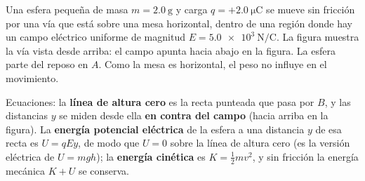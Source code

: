 \documentclass[12pt, a4paper]{article}
\begin{document}
\begin{exercise}[ID=montana-electrica, subtitle={Montaña rusa eléctrica}, tags={parcial3}, points=25, nuevapagina=true]
Una esfera pequeña de masa $m=\qty{2.0}{\gram}$ y carga $q=+\qty{2.0}{\micro\coulomb}$ se mueve sin fricción por una vía que está sobre una mesa horizontal, dentro de una región donde hay un campo eléctrico uniforme de magnitud $E=\qty{5.0e3}{\newton\per\coulomb}$. La figura muestra la vía vista desde arriba: el campo apunta hacia abajo en la figura. La esfera parte del reposo en $A$. Como la mesa es horizontal, el peso no influye en el movimiento.

Ecuaciones: la \textbf{línea de altura cero} es la recta punteada que pasa por $B$, y las distancias $y$ se miden desde ella \textbf{en contra del campo} (hacia arriba en la figura). La \textbf{energía potencial eléctrica} de la esfera a una distancia $y$ de esa recta es $U = qEy$, de modo que $U = 0$ sobre la línea de altura cero (es la versión eléctrica de $U = mgh$); la \textbf{energía cinética} es $K = \tfrac{1}{2} m v^2$, y sin fricción la energía mecánica $K + U$ se conserva.

\begin{center}
\end{center}


\end{exercise}
\end{document}

